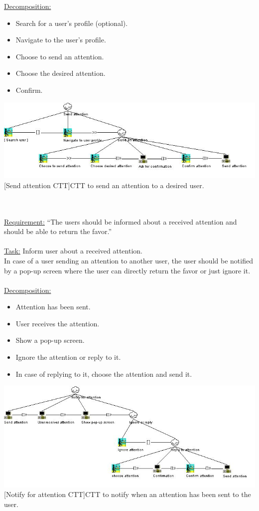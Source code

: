 \documentclass[11pt, a4paper,svglistings,oneside]{book}
\begin{document}
\underline{Decomposition:}
\begin{itemize}
\item Search for a user's profile (optional).
\item Navigate to the user's profile.
\item Choose to send an attention.
\item Choose the desired attention.
\item Confirm.
\end{itemize}
\noindent\begin{minipage}{\textwidth}
    \centering
   \includegraphics[width=\textwidth]{CTT_Attention.png}
 [Send attention CTT]{CTT to send an attention to a desired user.}
\end{minipage}
$\;$ \\ \\
\underline{Requirement:} ``The users should be informed about a received attention and should be able to return the favor.'' \\ \\
\underline{Task:} Inform user about a received attention. \\
In case of a user sending an attention to another user, the user should be notified by a pop-up screen where the user can directly return the favor or just ignore it. \\ \\
\underline{Decomposition:}
\begin{itemize}
\item Attention has been sent.
\item User receives the attention.
\item Show a pop-up screen.
\item Ignore the attention or reply to it.
\item In case of replying to it, choose the attention and send it.
\end{itemize}
\noindent\begin{minipage}{\textwidth}
    \centering
   \includegraphics[width=\textwidth]{CTT_AttentionNotify.png}
 [Notify for attention CTT]{CTT to notify when an attention has been sent to the user.}
\end{minipage}
\end{document}
